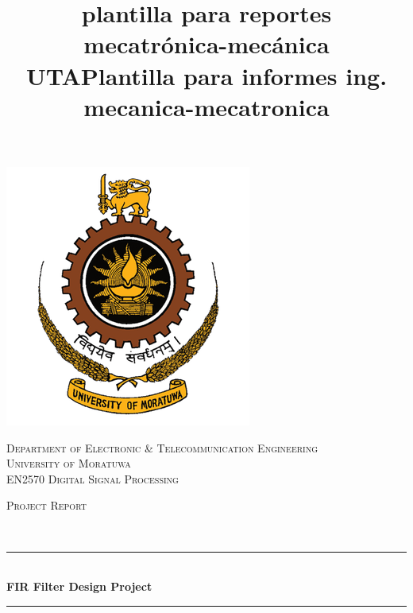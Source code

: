 \documentclass[11pt]{article}
\title{plantilla para reportes mecatrónica-mecánica UTA}
\title{Plantilla para informes ing. mecanica-mecatronica}
\begin{document}
\begin{center}																		%
\newcommand{\HRule}{\rule{\linewidth}{0.5mm}}									%
 


\includegraphics[scale = 0.30]{logo.png}


\vspace*{1.0cm}								%
\textsc{\huge  Department of Electronic \& Telecommunication Engineering\\ \vspace{5px} University of Moratuwa }\\[1.5cm]	

\textsc{\LARGE EN2570 Digital Signal Processing }\\[1.5cm]													%

\begin{minipage}{0.9\textwidth} 
\begin{center}																					%
\textsc{\LARGE Project Report }
\end{center}
\end{minipage}\\[0.5cm]
 			\vspace*{1cm}																		%
\HRule \\[0.4cm]																	%
{ \huge \bfseries FIR Filter Design Project }\\[0.4cm]	%
\HRule \\[1.5cm]																	%
\begin{minipage}{0.46\textwidth}													%
\begin{flushleft} \large															%


\end{flushleft}
\end{minipage}
\end{center}
\end{document}
